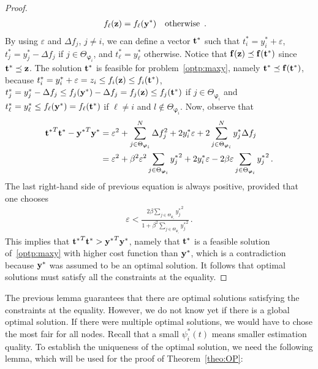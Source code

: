 \documentclass[a4paper,notitlepage,onecolumn]{article}
\def\f{{\bf f}}
\def\t{{\bf t}}
\def\y{{\bf y}}
\def\z{{\bf z}}
\def\varphib{\boldsymbol{\varphi}}
\numberwithin{equation}{section}
\begin{document}
\begin{proof}
\begin{align*}
f_\ell(\z) & = f_\ell(\y^*)  \quad \mbox{\rm otherwise } \,.
\end{align*}
By using $\varepsilon$ and $\Delta f_j$, $j\neq i$, we can define
a vector $\t^*$ such that $t_i^*=y_i^*+\varepsilon$,
$t_j^*=y_j^*-\Delta f_j$ if $j\in \Theta_{\varphib_i}$, and
$t_\ell^*=y_\ell^*$ otherwise. Notice that $\f(\z)\preceq\f(\t^*)$ since
$\t^*\preceq \z$. The solution $\t^*$ is feasible for
problem~\eqref{optp:maxy}, namely $\t^*\preceq \f(\t^*)$, because
$t_i^*=y_i^*+\varepsilon = z_i \leq f_i(\z) \leq f_i(\t^*)$,
$t_j^*=y_j^*-\Delta f_j \leq  f_j(\y^*) -\Delta f_j= f_j(\z) \leq
f_j(\t^*)$ if $j \in \Theta_{\varphib_i}$ and $t_\ell^* =y_\ell^* \leq
f_\ell(\y^*) = f_\ell(\t^*)$ if $\ell\neq i$ and $l \notin
\Theta_{\varphib_i}$. Now, observe that
\begin{align*}
{\t^*}^T\t^* - {\y^*}^T\y^* & =  \varepsilon^2 + \sum_{j\in \Theta_{\varphib_i}}^N \Delta f_j^2 + 2 y_i^*\varepsilon+
2 \sum_{j\in \Theta_{\varphib_i}}^N y_j^*\Delta f_j \\
& =  \varepsilon^2 +\beta^2 \varepsilon^2 \sum_{j\in
\Theta_{\varphib_i}}{y_j^*}^2 + 2y_i^* \varepsilon -2 \beta
\varepsilon  \sum_{j\in \Theta_{\varphib_i}} {y_j^*}^2\,.
\end{align*}
The last right-hand side of previous equation is always positive, provided that one chooses
\begin{align*}
\varepsilon < \frac{2\beta  \sum_{j\in \Theta_{\varphib_i}} {y_j^*}^2}{1+\beta^2 \sum_{j\in \Theta_{\varphib_i}}{y_j^*}^2}\,.
\end{align*}
This implies that ${\t^*}^T\t^* > {\y^*}^T\y^*$, namely that $\t^*$ is a feasible solution of~\eqref{optp:maxy} with higher cost function than $\y^*$, which is a contradiction because $\y^*$ was assumed to be an optimal solution. It follows that optimal solutions must satisfy all the constraints at the equality.
\end{proof}
The previous lemma guarantees that there are optimal solutions
satisfying the constraints at the equality. However, we do not
know yet if there is a global optimal solution. If there were
multiple optimal solutions, we would have to chose the most fair
for all nodes. Recall that a small $\psi_i^*(t)$ means smaller
estimation quality. To establish the uniqueness of the optimal
solution, we need the following lemma, which will be used for the
proof of Theorem~\ref{theo:OP}:
\end{document}
